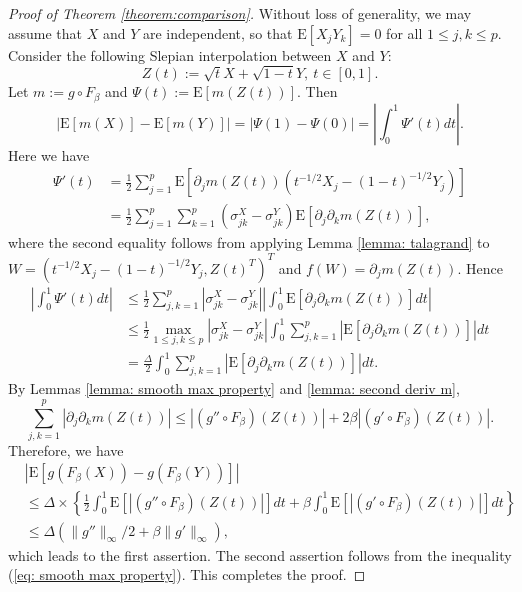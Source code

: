 \documentclass[11pt,reqno]{amsart}
\theoremstyle{definition}
\newcommand{\Ep}{{\mathrm{E}}}
\begin{document}
\begin{proof}[Proof of Theorem \ref{theorem:comparison}]
Without loss of generality, we may assume that $X$ and $Y$ are independent, so that $\Ep[X_{j} Y_k]=0$ for all $1 \leq j,k \leq p$.
Consider the following Slepian interpolation between $X$ and $Y$:
\begin{equation*}
Z(t):=\sqrt{t} X+\sqrt{1-t} Y, \ t \in [0,1].
\end{equation*}
Let $m := g \circ F_\beta$ and $\Psi(t):=\Ep[m (Z(t))]$.
Then
\begin{equation*}
|\Ep[m(X)]-\Ep[ m(Y) ]|= | \Psi (1) - \Psi (0)| =\left |\int_{0}^{1} \Psi'(t) dt\right|.
\end{equation*}
Here we have
\begin{align*}
\Psi'(t) & = \frac{1}{2} \sum_{j=1}^p \Ep [ \partial_{j} m(Z(t)) (t^{-1/2}X_{j}-(1-t)^{-1/2}Y_{j}) ]  \\
& = \frac{1}{2} \sum_{j=1}^p \sum_{k=1}^p (\sigma_{jk}^{X}-\sigma_{jk}^{Y}) \Ep[\partial_{j} \partial_k m (Z(t)) ],
\end{align*}
where the second equality follows from applying Lemma \ref{lemma: talagrand} to $W = (t^{-1/2}X_{j}-(1-t)^{-1/2}Y_{j}, Z(t)^{T})^{T}$
and $f(W)=\partial_{j} m(Z(t))$. Hence
\begin{align*}
\left |\int_{0}^{1} \Psi'(t) dt\right|
&\leq \frac{1}{2} \sum_{j,k=1}^{p} | \sigma_{jk}^{X}-\sigma_{jk}^{Y} | \left | \int_0^1 \Ep [\partial_{j} \partial_k m(Z(t))] dt \right| \\
&\leq \frac{1}{2} \max_{1 \leq j,k \leq p} | \sigma_{jk}^{X}-\sigma_{jk}^{Y} | \int_0^1 \sum_{j,k=1}^{p} \left | \Ep[\partial_{j} \partial_k m(Z(t))]\right | dt   \\
&= \frac{\Delta}{2} \int_0^1 \sum_{j,k=1}^{p} \left | \Ep[\partial_{j} \partial_k m(Z(t))]\right | dt.
\end{align*}
By Lemmas \ref{lemma: smooth max property} and \ref{lemma: second deriv m},
\begin{equation*}
\sum_{j,k=1}^{p} |\partial_{j} \partial_k m(Z(t))|   \leq   | (g'' \circ F_{\beta})(Z(t))| + 2 \beta | (g' \circ F_{\beta})(Z(t))|.
\end{equation*}
Therefore, we have
\begin{align*}
&\left|\Ep[g(F_{\beta}(X))-g(F_{\beta}(Y))]\right| \\
&\leq  \Delta \times  \left \{  \frac{1}{2} \int_0^1 \Ep[ | (g'' \circ F_{\beta})(Z(t))| ] dt +  \beta \int_0^1 \Ep [| (g' \circ F_{\beta})(Z(t))| ]dt\right \}  \\
&\leq  \Delta ( \| g'' \|_{\infty}/2 + \beta \| g' \|_{\infty}),
\end{align*}
which leads to the first assertion. The second assertion follows from the inequality (\ref{eq: smooth max property}). This completes the proof.
\end{proof}
\end{document}
